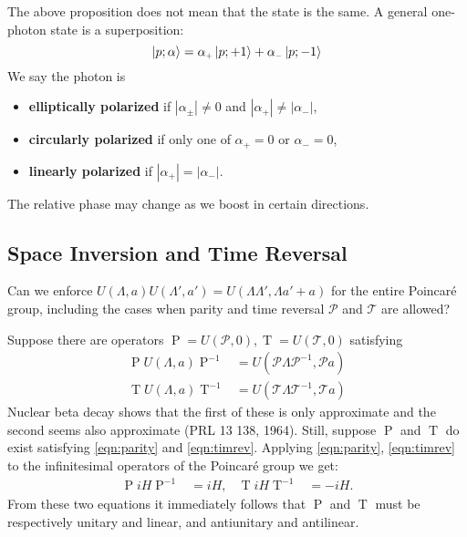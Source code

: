 \documentclass[10pt]{article}
\newcommand{\ms}{\mathscr}
\theoremstyle{plain}
\theoremstyle{definition}
\theoremstyle{remark}
\DeclareMathOperator{\rP}{P}
\DeclareMathOperator{\rT}{T}
\begin{document}
\newcommand{\ap}{\alpha_{\scriptscriptstyle +}}
\newcommand{\an}{\alpha_{\scriptscriptstyle -}}
\newcommand{\apm}{\alpha_{\scriptscriptstyle \pm}}
The above proposition does not mean that the state is the same.
A general one-photon state is a superposition:
\[ \ket{p;\alpha} = \ap \ket{p;+1} + \an\ket{p;-1} \]
We say the photon is
\begin{itemize}
    \vspace{-.1cm}
\item \textbf{elliptically polarized} if $|\apm|\ne0$ and $|\ap| \ne |\an|$, 
    \vspace{-.3cm}
\item \textbf{circularly polarized} if only one of $\ap=0$ or $\an=0$,
    \vspace{-.3cm}
\item \textbf{linearly polarized} if $|\ap| = |\an|$.
\end{itemize}
The relative phase may change as we boost in certain directions.

\subsection{Space Inversion and Time Reversal}

\begin{mdframed}[%
linewidth=2,roundcorner=10pt,leftmargin=20,
rightmargin=20,backgroundcolor= yellow!40,
linecolor=blue!70!black,frametitle=The Fight for a True Representation] 
Can we enforce $U(\Lambda,a)U(\Lambda',a') = U(\Lambda\Lambda',\Lambda
a'+a)$ for the entire Poincar\'e group, including the cases when
parity and time reversal $\ms P$ and $\ms T$ are allowed?
\end{mdframed}

Suppose there are operators $\rP = U(\ms P,0), \rT = U(\ms T,0)$ 
satisfying 
\begin{align}
\rP U(\Lambda,a)\rP^{-1}&=U(\ms P\Lambda\ms P^{-1},\ms Pa)\label{eqn:parity}\\ 
\rT U(\Lambda,a)\rT^{-1}&=U(\ms T\Lambda\ms T^{-1},\ms Ta)\label{eqn:timrev}
\end{align}
Nuclear beta decay shows that the first of these is only approximate
and the second seems also approximate (PRL 13 138, 1964). Still,
suppose $\rP$ and $\rT$ do exist satisfying \eqref{eqn:parity} and
\eqref{eqn:timrev}. Applying \eqref{eqn:parity}, \eqref{eqn:timrev} to
the infinitesimal operators of the Poincar\'e group we get:
\begin{align*}
    \rP iH \rP^{-1} &= iH, &
    \rT iH \rT^{-1} &=-iH.
\end{align*}
From these two equations it immediately follows that $\rP$ and $\rT$
must be respectively unitary and linear, and antiunitary and
antilinear. 
\end{document}
